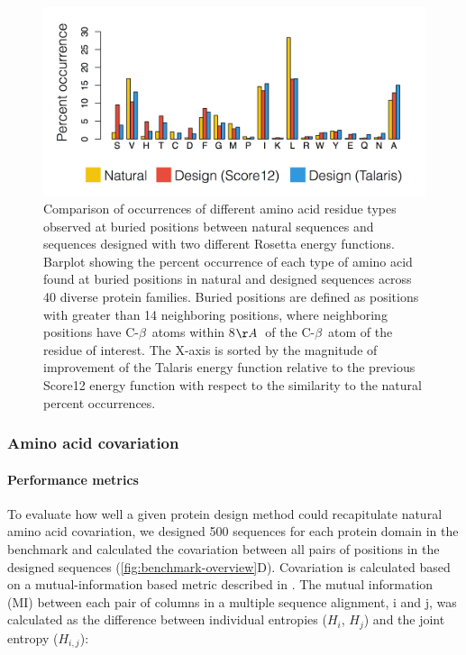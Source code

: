 \begin{figure}[H]
  \centering

  \includegraphics[width=\textwidth,keepaspectratio]{figures/benchmark-fig2.png}
  \caption[Comparison of occurrences of different amino acid residue types observed at buried positions between natural sequences and sequences designed with two different Rosetta energy functions]{Comparison of occurrences of different amino acid residue types observed at buried positions between natural sequences and sequences designed with two different Rosetta energy functions.
Barplot showing the percent occurrence of each type of amino acid found at buried positions in natural and designed sequences across 40 diverse protein families. Buried positions are defined as positions with greater than 14 neighboring positions, where neighboring positions have C-$\beta$\ atoms within 8$\AA$\ of the C-$\beta$\ atom of the residue of interest. The X-axis is sorted by the magnitude of improvement of the Talaris energy function relative to the previous Score12 energy function with respect to the similarity to the natural percent occurrences.}
  \label{fig:benchmark-occurance}
\end{figure}

\subsubsection{Amino acid covariation}

\paragraph{Performance metrics}

To evaluate how well a given protein design method could recapitulate natural amino acid covariation, we designed 500 sequences for each protein domain in the benchmark and calculated the covariation between all pairs of positions in the designed sequences (\cref{fig:benchmark-overview}D). Covariation is calculated based on a mutual-information based metric described in \cite{dickson_identifying_2010}. The mutual information (MI) between each pair of columns in a multiple sequence alignment, i and j, was calculated as the difference between individual entropies ($H_i$, $H_j$) and the joint entropy ($H_{i,j}$):

